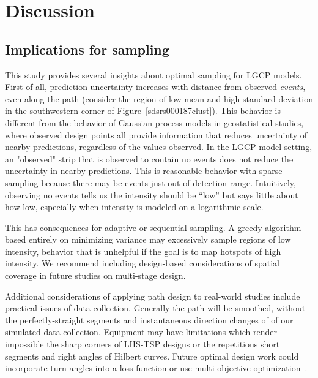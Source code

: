 \documentclass[review]{elsarticle}
\begin{document}


\section{Discussion}

\subsection{Implications for sampling}

This study provides several insights about optimal sampling for LGCP models.
First of all, prediction uncertainty increases with distance from observed
\emph{events}, even along the path (consider the region of low mean and high
standard deviation in the southwestern corner of
Figure~\ref{sdsrs000187clust}). This behavior is different from the behavior
of Gaussian process models in geostatistical studies, where observed design
points all provide information that reduces uncertainty of nearby predictions,
regardless of the values observed. In the LGCP model setting, an "observed"
strip that is observed to contain no events does not reduce the uncertainty in
nearby predictions. This is reasonable behavior with sparse sampling because
there may be events just out of detection range. Intuitively, observing no
events tells us the intensity should be ``low'' but says little about how low,
especially when intensity is modeled on a logarithmic scale.

This has consequences for adaptive or sequential sampling. A greedy algorithm
based entirely on minimizing variance may excessively sample regions of low
intensity, behavior that is unhelpful if the goal is to map hotspots of high
intensity. We recommend including design-based considerations of spatial
coverage in future studies on multi-stage design.

Additional considerations of applying path design to real-world studies include
practical issues of data collection. Generally the path will be smoothed,
without the perfectly-straight segments and instantaneous direction changes of
of our simulated data collection. Equipment may have limitations which render
impossible the sharp corners of LHS-TSP designs or the repetitious short
segments and right angles of Hilbert curves. Future optimal design work could
incorporate turn angles into a loss function or use multi-objective
optimization~\citep{lark}.
\end{document}
